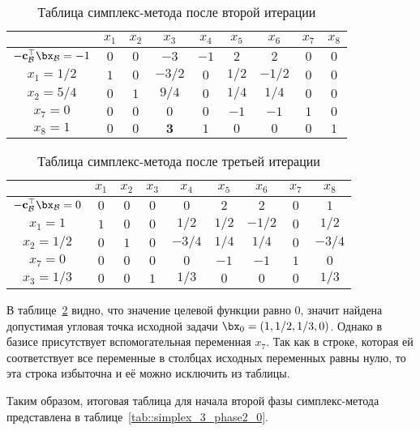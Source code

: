 \documentclass[12pt]{article}
\begin{document}
\begin{table}[!ht]
\centering
\caption{Таблица симплекс-метода после второй итерации}
\begin{tabular}{|c|cccccccc|}
\hline
& $x_1$ & $x_2$ & $x_3$ & $x_4$ & $x_5$ & $x_6$ & $x_7$ & $x_8$\\
\hline
$-\mathbf{c}_{\mathcal{B}}^{\top}\bx_{\mathcal{B}} = -1$ & $0$ & $0$ & $-3$ & $-1$ & $2$ & $2$ & $0$ & $0$ \\
\hline
$x_1 = 1/2$ & $1$ & $0$ & $-3/2$ & $0$ & $1/2$ & $-1/2$ & $0$ & $0$ \\
$x_2 = 5/4$ & $0$ & $1$ & $9/4$ & $0$ & $1/4$ & $1/4$ & $0$ & $0$ \\
$x_7 = 0$ & $0$ & $0$ & $0$ & $0$ & $-1$ & $-1$ & $1$ & $0$ \\
$x_8 = 1$ & $0$ & $0$ & $\mathbf{3}$ & $1$ & $0$ & $0$ & $0$ & $1$\\
\hline
\end{tabular}
\label{tab::simplex_32}
\end{table}

\begin{table}[!ht]
\centering
\caption{Таблица симплекс-метода после третьей итерации}
\begin{tabular}{|c|cccccccc|}
\hline
& $x_1$ & $x_2$ & $x_3$ & $x_4$ & $x_5$ & $x_6$ & $x_7$ & $x_8$\\
\hline
$-\mathbf{c}_{\mathcal{B}}^{\top}\bx_{\mathcal{B}} = 0$ & $0$ & $0$ & $0$ & $0$ & $2$ & $2$ & $0$ & $1$ \\
\hline
$x_1 = 1$ & $1$ & $0$ & $0$ & $1/2$ & $1/2$ & $-1/2$ & $0$ & $1/2$ \\
$x_2 = 1/2$ & $0$ & $1$ & $0$ & $-3/4$ & $1/4$ & $1/4$ & $0$ & $-3/4$ \\
$x_7 = 0$ & $0$ & $0$ & $0$ & $0$ & $-1$ & $-1$ & $1$ & $0$ \\
$x_3 = 1/3$ & $0$ & $0$ & $1$ & $1/3$ & $0$ & $0$ & $0$ & $1/3$\\
\hline
\end{tabular}
\label{tab::simplex_33}
\end{table}

В таблице~\ref{tab::simplex_33} видно, что значение целевой функции равно 0, значит найдена допустимая угловая точка исходной задачи $\bx_0 = (1, 1/2, 1/3, 0)$.
Однако в базисе присутствует вспомогательная переменная $x_7$.
Так как в строке, которая ей соответствует все переменные в столбцах исходных переменных равны нулю, то эта строка избыточна и её можно исключить из таблицы.

Таким образом, итоговая таблица для начала второй фазы симплекс-метода представлена в таблице~\ref{tab::simplex_3_phase2_0}.
\end{document}
